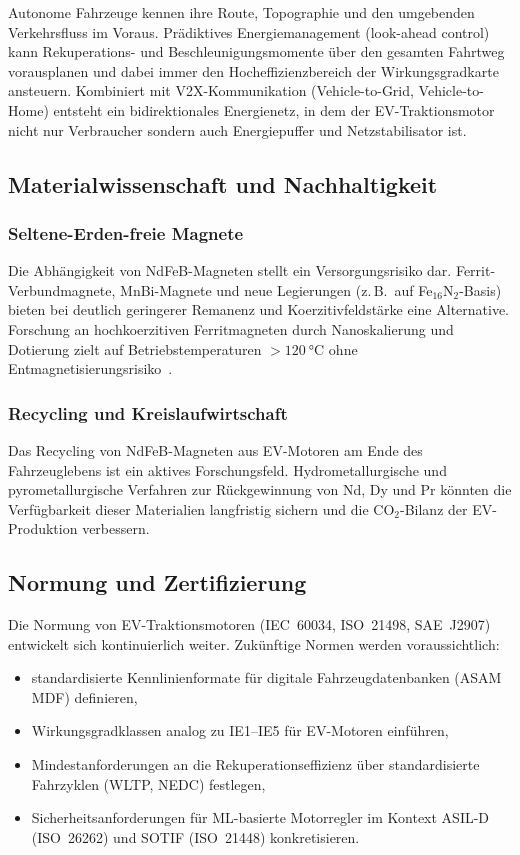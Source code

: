 ﻿\documentclass[a4paper,12pt]{article}
\theoremstyle{definition}
\begin{document}
Autonome Fahrzeuge kennen ihre Route, Topographie und den umgebenden
Verkehrsfluss im Voraus. Prädiktives Energiemanagement (look-ahead control)
kann Rekuperations- und Beschleunigungsmomente über den gesamten Fahrtweg
vorausplanen und dabei immer den Hocheffizienzbereich der Wirkungsgradkarte
ansteuern. Kombiniert mit V2X-Kommunikation (Vehicle-to-Grid, Vehicle-to-Home)
entsteht ein bidirektionales Energienetz, in dem der EV-Traktionsmotor nicht
nur Verbraucher sondern auch Energiepuffer und Netzstabilisator ist.

\subsection{Materialwissenschaft und Nachhaltigkeit}

\subsubsection{Seltene-Erden-freie Magnete}

Die Abhängigkeit von NdFeB-Magneten stellt ein Versorgungsrisiko dar.
Ferrit-Verbundmagnete, MnBi-Magnete und neue Legierungen (z.\,B.\ auf
Fe$_{16}$N$_2$-Basis) bieten bei deutlich geringerer Remanenz und
Koerzitivfeldstärke eine Alternative. Forschung an hochkoerzitiven Ferritmagneten
durch Nanoskalierung und Dotierung zielt auf Betriebstemperaturen $>\SI{120}{\degreeCelsius}$
ohne Entmagnetisierungsrisiko~\cite{gutfleisch2011magnetic}.

\subsubsection{Recycling und Kreislaufwirtschaft}

Das Recycling von NdFeB-Magneten aus EV-Motoren am Ende des Fahrzeuglebens
ist ein aktives Forschungsfeld. Hydrometallurgische und pyrometallurgische
Verfahren zur Rückgewinnung von Nd, Dy und Pr könnten die Verfügbarkeit
dieser Materialien langfristig sichern und die $\mathrm{CO}_2$-Bilanz der
EV-Produktion verbessern.

\subsection{Normung und Zertifizierung}

Die Normung von EV-Traktionsmotoren (IEC~60034, ISO~21498, SAE~J2907) entwickelt
sich kontinuierlich weiter. Zukünftige Normen werden voraussichtlich:
\begin{itemize}
    \item standardisierte Kennlinienformate für digitale Fahrzeugdatenbanken
          (ASAM MDF) definieren,
    \item Wirkungsgradklassen analog zu IE1--IE5 für EV-Motoren einführen,
    \item Mindestanforderungen an die Rekuperationseffizienz über standardisierte
          Fahrzyklen (WLTP, NEDC) festlegen,
    \item Sicherheitsanforderungen für ML-basierte Motorregler im Kontext
          ASIL-D (ISO~26262) und SOTIF (ISO~21448) konkretisieren.
\end{itemize}
\end{document}
